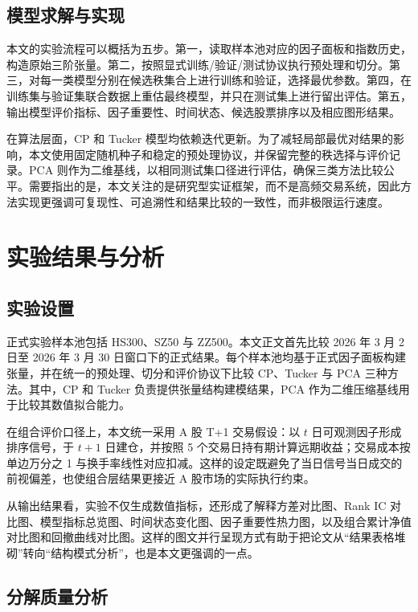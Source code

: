 \section{模型求解与实现}

本文的实验流程可以概括为五步。第一，读取样本池对应的因子面板和指数历史，构造原始三阶张量。第二，按照显式训练/验证/测试协议执行预处理和切分。第三，对每一类模型分别在候选秩集合上进行训练和验证，选择最优参数。第四，在训练集与验证集联合数据上重估最终模型，并只在测试集上进行留出评估。第五，输出模型评价指标、因子重要性、时间状态、候选股票排序以及相应图形结果。

在算法层面，CP 和 Tucker 模型均依赖迭代更新。为了减轻局部最优对结果的影响，本文使用固定随机种子和稳定的预处理协议，并保留完整的秩选择与评价记录。PCA 则作为二维基线，以相同测试集口径进行评估，确保三类方法比较公平。需要指出的是，本文关注的是研究型实证框架，而不是高频交易系统，因此方法实现更强调可复现性、可追溯性和结果比较的一致性，而非极限运行速度。

\chapter{实验结果与分析}

\section{实验设置}

正式实验样本池包括 HS300、SZ50 与 ZZ500。本文正文首先比较 2026 年 3 月 2 日至 2026 年 3 月 30 日窗口下的正式结果。每个样本池均基于正式因子面板构建张量，并在统一的预处理、切分和评价协议下比较 CP、Tucker 与 PCA 三种方法。其中，CP 和 Tucker 负责提供张量结构建模结果，PCA 作为二维压缩基线用于比较其数值拟合能力。

在组合评价口径上，本文统一采用 A 股 T+1 交易假设：以 $t$ 日可观测因子形成排序信号，于 $t+1$ 日建仓，并按照 5 个交易日持有期计算远期收益；交易成本按单边万分之 1 与换手率线性对应扣减。这样的设定既避免了当日信号当日成交的前视偏差，也使组合层结果更接近 A 股市场的实际执行约束。

从输出结果看，实验不仅生成数值指标，还形成了解释方差对比图、Rank IC 对比图、模型指标总览图、时间状态变化图、因子重要性热力图，以及组合累计净值对比图和回撤曲线对比图。这样的图文并行呈现方式有助于把论文从“结果表格堆砌”转向“结构模式分析”，也是本文更强调的一点。

\section{分解质量分析}

